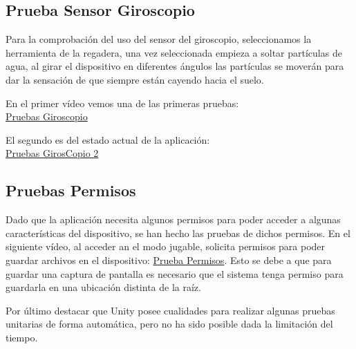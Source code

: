 \subsection{Prueba Sensor Giroscopio}
Para la comprobación del uso del sensor del giroscopio, seleccionamos la herramienta de la regadera, una vez seleccionada empieza a soltar partículas de agua, al girar el dispositivo en diferentes ángulos las partículas se moverán para dar la sensación de que siempre están cayendo hacia el suelo. 

En el primer vídeo vemos una de las primeras pruebas:\\ \href{https://www.youtube.com/watch?v=O9vR6dptWag}{Pruebas Giroscopio}

 El segundo es del estado actual de la aplicación:\\ \href{https://www.youtube.com/watch?v=ZpLFIQjsxmY}{Pruebas GirosCopio 2}

\subsection{Pruebas Permisos}
Dado que la aplicación necesita algunos permisos para poder acceder a algunas características del dispositivo, se han hecho las pruebas de dichos permisos. En el siguiente vídeo, al acceder an el modo jugable, solicita permisos para poder guardar archivos en el dispositivo: \href{https://www.youtube.com/watch?v=QWSm2oUMCtA}{Prueba Permisos}. Esto se debe a que para guardar una captura de pantalla es necesario que el sistema tenga permiso para guardarla en una ubicación distinta de la raíz.




Por último destacar que Unity posee cualidades para realizar algunas pruebas unitarias de forma automática, pero no ha sido posible dada la limitación del tiempo.
